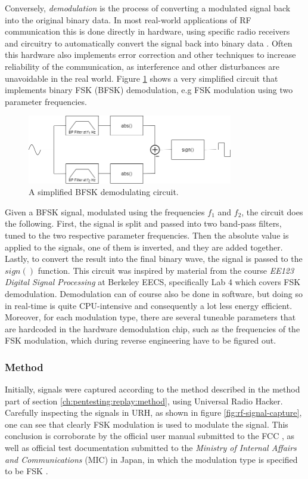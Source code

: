 Conversely, \textit{demodulation} is the process of converting a modulated signal back into the original binary data. In most real-world applications of RF communication this is done directly in hardware, using specific radio receivers and circuitry to automatically convert the signal back into binary data \cite{rf-modulation}. Often this hardware also implements error correction and other techniques to increase reliability of the communication, as interference and other disturbances are unavoidable in the real world. Figure \ref{fig:bfsk-demodulator} shows a very simplified circuit that implements binary FSK (BFSK) demodulation, e.g FSK modulation using two parameter frequencies.
\begin{figure}[!ht]
    \centering
    \includegraphics[width=0.8\textwidth]{images/6-pentesting/bfsk-demodulator.png}
    \caption{A simplified BFSK demodulating circuit.}
    \label{fig:bfsk-demodulator}
\end{figure}
Given a BFSK signal, modulated using the frequencies $f_1$ and $f_2$, the circuit does the following. First, the signal is split and passed into two band-pass filters, tuned to the two respective parameter frequencies. Then the absolute value is applied to the signals, one of them is inverted, and they are added together. Lastly, to convert the result into the final binary wave, the signal is passed to the $sign()$ function. This circuit was inspired by material from the course \textit{EE123 Digital Signal Processing} at Berkeley EECS, specifically Lab 4 which covers FSK demodulation. Demodulation can of course also be done in software, but doing so in real-time is quite CPU-intensive and consequently a lot less energy efficient. Moreover, for each modulation type, there are several tuneable parameters that are hardcoded in the hardware demodulation chip, such as the frequencies of the FSK modulation, which during reverse engineering have to be figured out.

\subsubsection{Method}
Initially, signals were captured according to the method described in the method part of section \ref{ch:pentesting:replay:method}, using Universal Radio Hacker. Carefully inspecting the signals in \gls{URH}, as shown in figure \ref{fig:rf-signal-capture}, one can see that clearly \gls{FSK} modulation is used to modulate the signal. This conclusion is corroborate by the official user manual submitted to the FCC \cite{hsgw-user-manual}, as well as official test documentation submitted to the \textit{Ministry of Internal Affairs and Communications} (MIC) in Japan, in which the modulation type is specified to be FSK \cite{mic-test-report}.

